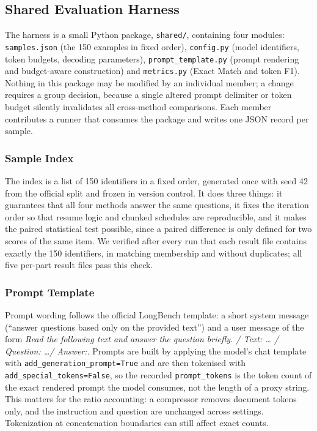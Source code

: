 \documentclass[10pt,a4paper,twocolumn]{article}
\begin{document}
\subsection{Shared Evaluation Harness}

The harness is a small Python package, \texttt{shared/}, containing four modules:
\texttt{samples.json} (the 150 examples in fixed order), \texttt{config.py} (model
identifiers, token budgets, decoding parameters), \texttt{prompt\_template.py}
(prompt rendering and budget-aware construction) and \texttt{metrics.py} (Exact
Match and token F1). Nothing in this package may be modified by an individual
member; a change requires a group decision, because a single altered prompt
delimiter or token budget silently invalidates all cross-method comparisons. Each
member contributes a runner that consumes the package and writes one JSON record
per sample.

\subsubsection{Sample Index}

The index is a list of 150 identifiers in a fixed order, generated once with seed
42 from the official split and frozen in version control. It does three things: it
guarantees that all four methods answer the same questions, it fixes the iteration
order so that resume logic and chunked schedules are reproducible, and it makes
the paired statistical test possible, since a paired difference is only defined
for two scores of the same item. We verified after every run that each result file
contains exactly the 150 identifiers, in matching membership and without
duplicates; all five per-part result files pass this check.

\subsubsection{Prompt Template}

Prompt wording follows the official LongBench template: a short system message
(``answer questions based only on the provided text'') and a user message of the
form \emph{Read the following text and answer the question briefly. / Text: \dots
/ Question: \dots / Answer:}. Prompts are built by applying the model's chat
template with \texttt{add\_generation\_prompt=True} and are then tokenised with
\texttt{add\_special\_tokens=False}, so the recorded \texttt{prompt\_tokens} is
the token count of the exact rendered prompt the model consumes, not the length of a
proxy string. This matters for the ratio accounting: a compressor removes document
tokens only, and the instruction and question are unchanged across settings. Tokenization at concatenation boundaries can still affect exact counts.
\end{document}
